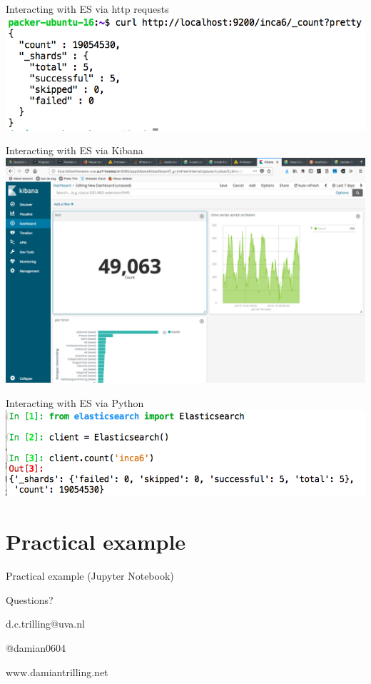 \documentclass{beamer}
\begin{document}
\begin{frame}{Interacting with ES via http requests}
	\includegraphics[width=\columnwidth,height=\paperheight,keepaspectratio]{curl}
\end{frame}


\begin{frame}{Interacting with ES via Kibana}
	\includegraphics[width=\columnwidth,height=\paperheight,keepaspectratio]{kibana}
\end{frame}


\begin{frame}{Interacting with ES via Python}
	\includegraphics[width=\columnwidth,height=\paperheight,keepaspectratio]{python}
\end{frame}




\section{Practical example}

\begin{frame}
	Practical example (Jupyter Notebook)
\end{frame}

\begin{frame}{Questions?}
\huge
\centering

d.c.trilling@uva.nl

@damian0604

www.damiantrilling.net


	
\end{frame}
\end{document}
